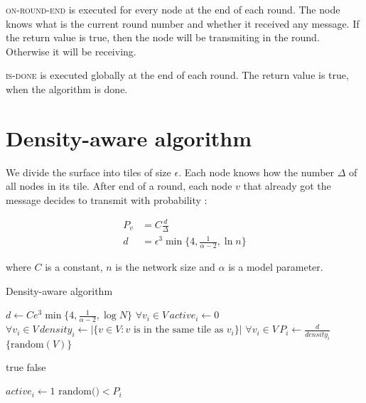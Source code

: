 \documentclass[a4paper,12pt]{report}
\begin{document}
\textsc{on-round-end} is executed for every node at the end of each round. The node knows what is the current round number and whether it received any message. If the return  value  is true, then the node will be transmiting in the round. Otherwise it will be receiving.

\textsc{is-done} is executed globally at the end of each round. The return value is true, when the algorithm is done.

\section{Density-aware algorithm}

We divide the surface into tiles of size $\epsilon$. Each node knows how the number $\Delta$ of all nodes in its tile. After end of a round, each node $v$ that already got the message decides to transmit with probability :

\begin{align}
\label{eq:dens_alg_prob}
P_v &= C  \frac{d}{\Delta} \\
d &= \epsilon^3  \min\{4, \frac{1}{\alpha - 2}, \ln n\} \nonumber
\end{align}

where $C$ is a constant, $n$ is the network size and $\alpha$ is a model  parameter.

\begin{algorithm}
\caption{Density-aware algorithm}
\label{a:density}
\begin{algorithmic}
        \State $d \gets C e^3 \min\{4, \frac{1}{\alpha - 2}, \log N\}$
        \State $\forall v_i \in V \, active_i \gets 0$
        \State $\forall v_i \in V \,density_i \gets |\{v \in V :  v \text{ is in the same tile as } v_i\}|$
        \State $\forall v_i \in V \,P_i \gets \frac{d}{density_i}$
        \State \Return $\{\text{random}(V)\}$
\EndFunction

\Statex

		\State \Return true
	\Else
		\State \Return false
	\EndIf
\EndFunction

\Statex

		\State $active_i \gets 1$
	\EndIf
		\State \Return $\text{random()} < P_i$
	\Else
		\State {}
	\EndIf 
\EndFunction
\end{algorithmic}
\end{algorithm}
\end{document}
